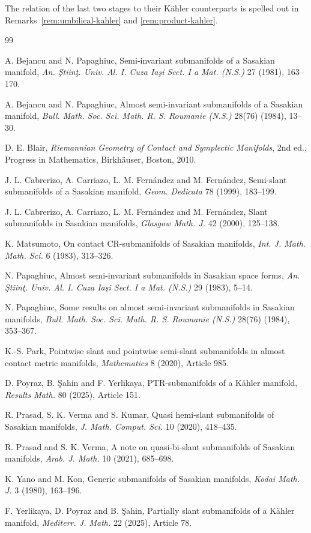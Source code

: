 \documentclass[11pt]{article}
\theoremstyle{definition}\newtheorem{definition}[theorem]{Definition}\newtheorem{example}[theorem]{Example}
\theoremstyle{remark}\newtheorem{remark}[theorem]{Remark}
\begin{document}
The relation of the last two stages to their K\"ahler counterparts is
spelled out in Remarks~\ref{rem:umbilical-kahler} and
\ref{rem:product-kahler}.
\begin{thebibliography}{99}

 A. Bejancu and N. Papaghiuc, Semi-invariant submanifolds of a Sasakian manifold, \emph{An. \c{S}tiin\c{t}. Univ. Al. I. Cuza Ia\c{s}i Sect. I a Mat. (N.S.)} 27 (1981), 163--170.

A. Bejancu and N. Papaghiuc,
Almost semi-invariant submanifolds of a Sasakian manifold,
\emph{Bull. Math. Soc. Sci. Math. R. S. Roumanie (N.S.)}
28(76) (1984), 13--30.

 D. E. Blair, \emph{Riemannian Geometry of Contact and Symplectic Manifolds}, 2nd ed., Progress in Mathematics, Birkh\"auser, Boston, 2010.

 J. L. Cabrerizo, A. Carriazo, L. M. Fern\'andez and M. Fern\'andez, Semi-slant submanifolds of a Sasakian manifold, \emph{Geom. Dedicata} 78 (1999), 183--199.

 J. L. Cabrerizo, A. Carriazo, L. M. Fern\'andez and M. Fern\'andez, Slant submanifolds in Sasakian manifolds, \emph{Glasgow Math. J.} 42 (2000), 125--138.

 K. Matsumoto, On contact CR-submanifolds of Sasakian manifolds, \emph{Int. J. Math. Math. Sci.} 6 (1983), 313--326.

N. Papaghiuc,
Almost semi-invariant submanifolds in Sasakian space forms,
\emph{An. \c{S}tiin\c{t}. Univ. Al. I. Cuza Ia\c{s}i Sect. I a Mat. (N.S.)}
29 (1983), 5--14.

N. Papaghiuc,
Some results on almost semi-invariant submanifolds in Sasakian manifolds,
\emph{Bull. Math. Soc. Sci. Math. R. S. Roumanie (N.S.)}
28(76) (1984), 353--367.

 K.-S. Park, Pointwise slant and pointwise semi-slant submanifolds in almost contact metric manifolds, \emph{Mathematics} 8 (2020), Article 985.

 D. Poyraz, B. \c{S}ahin and F. Yerlikaya, PTR-submanifolds of a K\"ahler manifold, \emph{Results Math.} 80 (2025), Article 151.

R. Prasad, S. K. Verma and S. Kumar,
Quasi hemi-slant submanifolds of Sasakian manifolds,
\emph{J. Math. Comput. Sci.} 10 (2020), 418--435.

 R. Prasad and S. K. Verma, A note on quasi-bi-slant submanifolds of Sasakian manifolds, \emph{Arab. J. Math.} 10 (2021), 685--698.

 K. Yano and M. Kon, Generic submanifolds of Sasakian manifolds, \emph{Kodai Math. J.} 3 (1980), 163--196.

 F. Yerlikaya, D. Poyraz and B. \c{S}ahin, Partially slant submanifolds of a K\"ahler manifold, \emph{Mediterr. J. Math.} 22 (2025), Article 78.
\end{thebibliography}
\end{document}
